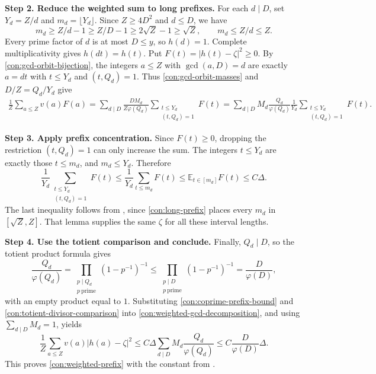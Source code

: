 \documentclass[twoside]{aomart}
\makeatletter
\theoremstyle{paperplain}
\theoremstyle{paperdefinition}
\renewenvironment{proof}[1][\proofname]{\par\pushQED{\qed}%
  \normalfont\topsep6\p@\@plus3\p@\relax\trivlist
  \item[\hskip\labelsep\itshape #1\@addpunct{.}]\ignorespaces
}{\popQED\endtrivlist\@endpefalse}
\newcommand{\E}{\mathbb E}
\numberwithin{equation}{section}
\makeatother
\begin{document}
\begin{proof}
\medskip
\noindent\textbf{Step 2. Reduce the weighted sum to long prefixes.}
For each $d\mid D$, set $Y_d=Z/d$ and $m_d=\lfloor Y_d\rfloor$.
Since $Z\ge4D^2$ and $d\le D$, we have
\begin{equation}
 m_d\ge Z/d-1\ge Z/D-1\ge2\sqrt Z-1\ge\sqrt Z,\qquad
 m_d\le Z/d\le Z.
 \label{con:long-prefix}
\end{equation}
Every prime factor of $d$ is at most $D\le y$, so $h(d)=1$.
Complete multiplicativity gives $h(dt)=h(t)$.
Put $F(t)=|h(t)-\zeta|^2\ge0$.
By \eqref{con:gcd-orbit-bijection}, the integers $a\le Z$
with $\gcd(a,D)=d$ are exactly $a=dt$ with
$t\le Y_d$ and $(t,Q_d)=1$.
Thus \eqref{con:gcd-orbit-masses} and $D/Z=Q_d/Y_d$ give
\begin{equation}
 \begin{aligned}
 \frac1Z\sum_{a\le Z}v(a)F(a)
 =\sum_{d\mid D}\frac{DM_d}{Z\varphi(Q_d)}
       \sum_{\substack{t\le Y_d\\(t,Q_d)=1}}F(t)
 =\sum_{d\mid D}M_d\frac{Q_d}{\varphi(Q_d)}\frac1{Y_d}
       \sum_{\substack{t\le Y_d\\(t,Q_d)=1}}F(t).
 \end{aligned}
 \label{con:weighted-gcd-decomposition}
\end{equation}

\medskip
\noindent\textbf{Step 3. Apply prefix concentration.}
Since $F(t)\ge0$, dropping the restriction $(t,Q_d)=1$
can only increase the sum.
The integers $t\le Y_d$ are exactly those $t\le m_d$, and
$m_d\le Y_d$. Therefore
\begin{equation}
 \frac1{Y_d}\sum_{\substack{t\le Y_d\\(t,Q_d)=1}}F(t)
 \le\frac1{Y_d}\sum_{t\le m_d}F(t)
 \le\E_{t\in[m_d]}F(t)
 \le C\Delta.
 \label{con:coprime-prefix-bound}
\end{equation}
The last inequality follows from , since
\eqref{con:long-prefix} places every $m_d$ in $[\sqrt Z,Z]$.
That lemma supplies the same $\zeta$ for all these interval lengths.

\medskip
\noindent\textbf{Step 4. Use the totient comparison and conclude.}
Finally, $Q_d\mid D$, so the totient product formula gives
\begin{equation}
 \frac{Q_d}{\varphi(Q_d)}
 =\prod_{\substack{p\mid Q_d\\p\ \mathrm{prime}}}(1-p^{-1})^{-1}
 \le\prod_{\substack{p\mid D\\p\ \mathrm{prime}}}(1-p^{-1})^{-1}
 =\frac D{\varphi(D)},
 \label{con:totient-divisor-comparison}
\end{equation}
with an empty product equal to $1$.
Substituting \eqref{con:coprime-prefix-bound} and
\eqref{con:totient-divisor-comparison} into
\eqref{con:weighted-gcd-decomposition}, and using
$\displaystyle\sum_{d\mid D}M_d=1$, yields
\begin{equation*}
 \frac1Z\sum_{a\le Z}v(a)|h(a)-\zeta|^2
 \le C\Delta\sum_{d\mid D}M_d\frac{Q_d}{\varphi(Q_d)}
 \le C\frac D{\varphi(D)}\Delta.
 \end{equation*}
This proves \eqref{con:weighted-prefix} with the constant from
.
\end{proof}
\end{document}
